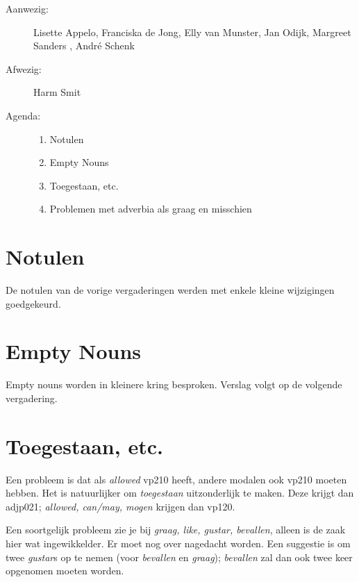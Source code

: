 

   \RosSupersedes{-}
   \MakeRosTitle
%
%
\begin{description}
\item[Aanwezig:] Lisette Appelo, Franciska de Jong, Elly van Munster,
                 Jan Odijk, Margreet Sanders ,
                 Andr\'{e} Schenk
\item[Afwezig:] Harm Smit


\item[Agenda:]\mbox{}
  \begin{enumerate}
  \item Notulen
  \item Empty Nouns
  \item Toegestaan, etc.
  \item Problemen met adverbia als graag en misschien
  \end{enumerate}
\end{description}

\section{Notulen}
De notulen van de vorige vergaderingen werden met enkele kleine wijzigingen
goedgekeurd. 

\section{Empty Nouns}
Empty nouns worden in kleinere kring besproken. Verslag volgt op de volgende 
vergadering.

\section{Toegestaan, etc.}
Een probleem is dat als {\em allowed} vp210 heeft, andere modalen ook vp210
moeten hebben. Het is natuurlijker om {\em toegestaan} uitzonderlijk te maken. 
Deze krijgt dan adjp021; {\em allowed, can/may, mogen} krijgen dan vp120.

Een soortgelijk probleem zie je bij {\em graag, like, gustar, bevallen}, alleen 
is de zaak hier wat ingewikkelder. Er moet nog over nagedacht worden. Een 
suggestie is om twee {\em gustar}s op te nemen (voor {\em bevallen} en {\em 
graag}); {\em bevallen} zal dan ook twee keer opgenomen moeten worden.


